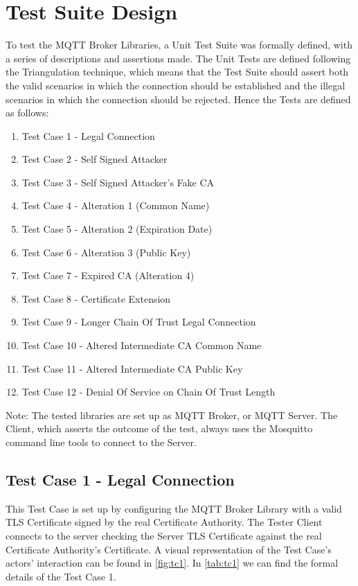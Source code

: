 \documentclass[binding=0.6cm,noexaminfo]{sapthesis}
\begin{document}
\chapter{Test Suite Design}\label{ch:test_suite}
To test the MQTT Broker Libraries, a Unit Test Suite was formally defined, with a series of descriptions and assertions made. The Unit Tests are defined following the Triangulation technique, which means that the Test Suite should assert both the valid scenarios in which the connection should be established and the illegal scenarios in which the connection should be rejected. Hence the Tests are defined as follows:
\begin{enumerate}
	\item Test Case 1 - Legal Connection
	\item Test Case 2 - Self Signed Attacker
	\item Test Case 3 - Self Signed Attacker's Fake CA
	\item Test Case 4 - Alteration 1 (Common Name)
	\item Test Case 5 - Alteration 2 (Expiration Date)
	\item Test Case 6 - Alteration 3 (Public Key)
	\item Test Case 7 - Expired CA (Alteration 4)
	\item Test Case 8 - Certificate Extension
	\item Test Case 9 - Longer Chain Of Trust Legal Connection
	\item Test Case 10 - Altered Intermediate CA Common Name
	\item Test Case 11 - Altered Intermediate CA Public Key
	\item Test Case 12 - Denial Of Service on Chain Of Trust Length
\end{enumerate}
Note: The tested libraries are set up as MQTT Broker, or MQTT Server. The Client, which asserts the outcome of the test, always uses the Mosquitto command line tools to connect to the Server.

\section{Test Case 1 - Legal Connection}
This Test Case is set up by configuring the MQTT Broker Library with a valid TLS Certificate signed by the real Certificate Authority. The Tester Client connects to the server checking the Server TLS Certificate against the real Certificate Authority’s Certificate. A visual representation of the Test Case's actors' interaction can be found in \autoref{fig:tc1}. In \autoref{tab:tc1} we can find the formal details of the Test Case 1.
\end{document}
